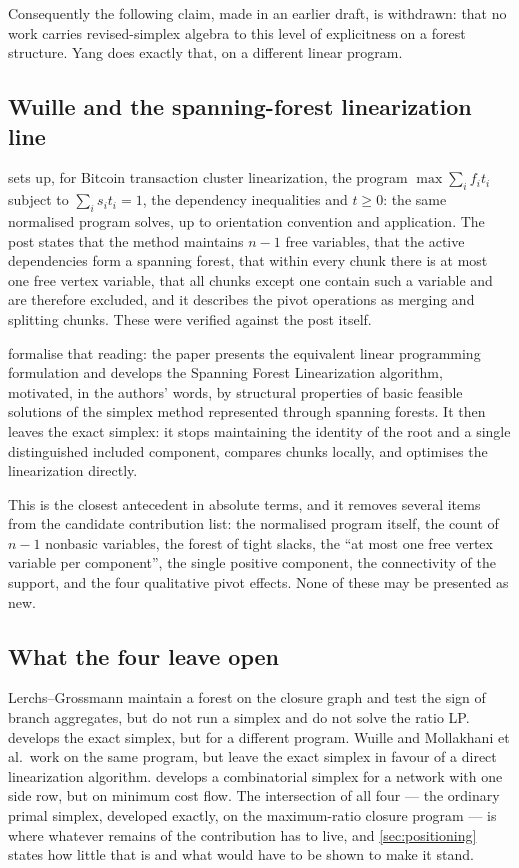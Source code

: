 Consequently the following claim, made in an earlier draft, is withdrawn: that
no work carries revised-simplex algebra to this level of explicitness on a
forest structure. Yang does exactly that, on a different linear program.

\subsection{Wuille and the spanning-forest linearization line}

\citet{Wuille2025} sets up, for Bitcoin transaction cluster linearization, the
program \(\max \sum_i f_i t_i\) subject to \(\sum_i s_i t_i = 1\), the dependency
inequalities and \(t \ge 0\): the same normalised program \FS{} solves, up to
orientation convention and application. The post states that the method
maintains \(n-1\) free variables, that the active dependencies form a spanning
forest, that within every chunk there is at most one free vertex variable, that
all chunks except one contain such a variable and are therefore excluded, and it
describes the pivot operations as merging and splitting chunks. These were
verified against the post itself.

\citet{MollakhaniEtAl2026} formalise that reading: the paper presents the
equivalent linear programming formulation and develops the Spanning Forest
Linearization algorithm, motivated, in the authors' words, by structural
properties of basic feasible solutions of the simplex method represented through
spanning forests. It then leaves the exact simplex: it stops maintaining the
identity of the root and a single distinguished included component, compares
chunks locally, and optimises the linearization directly.

This is the closest antecedent in absolute terms, and it removes several items
from the candidate contribution list: the normalised program itself, the count
of \(n-1\) nonbasic variables, the forest of tight slacks, the ``at most one
free vertex variable per component'', the single positive component, the
connectivity of the support, and the four qualitative pivot effects. None of
these may be presented as new.

\subsection{What the four leave open}

Lerchs--Grossmann maintain a forest on the closure graph and test the sign of
branch aggregates, but do not run a simplex and do not solve the ratio LP.
\citet{Yang2026} develops the exact simplex, but for a different program. Wuille
and Mollakhani et al.\ work on the same program, but leave the exact simplex in
favour of a direct linearization algorithm. \citet{HolzhauserEtAl2017} develops a
combinatorial simplex for a network with one side row, but on minimum cost flow.
The intersection of all four --- the ordinary primal simplex, developed exactly,
on the maximum-ratio closure program --- is where whatever remains of the
contribution has to live, and \cref{sec:positioning} states how little that is
and what would have to be shown to make it stand.
